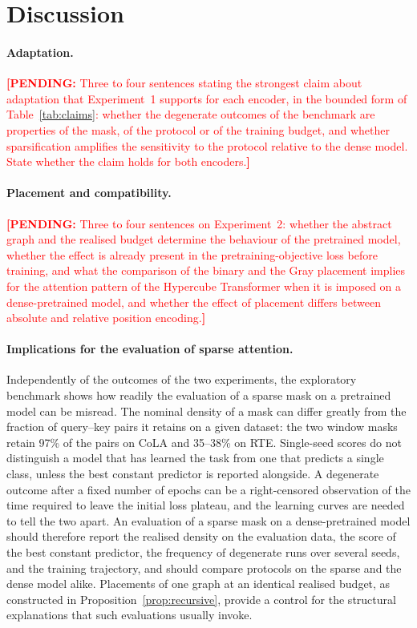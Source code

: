 \documentclass[10pt]{article}
\newcommand{\pending}[1]{\textcolor{red}{\textbf{[PENDING:} #1\textbf{]}}}
\begin{document}
\section{Discussion}
\label{sec:discussion}

\paragraph{Adaptation.} \pending{Three to four sentences stating the strongest claim about adaptation that Experiment~1 supports for each encoder, in the bounded form of Table~\ref{tab:claims}: whether the degenerate outcomes of the benchmark are properties of the mask, of the protocol or of the training budget, and whether sparsification amplifies the sensitivity to the protocol relative to the dense model. State whether the claim holds for both encoders.}

\paragraph{Placement and compatibility.} \pending{Three to four sentences on Experiment~2: whether the abstract graph and the realised budget determine the behaviour of the pretrained model, whether the effect is already present in the pretraining-objective loss before training, and what the comparison of the binary and the Gray placement implies for the attention pattern of the Hypercube Transformer when it is imposed on a dense-pretrained model, and whether the effect of placement differs between absolute and relative position encoding.}

\paragraph{Implications for the evaluation of sparse attention.} Independently of the outcomes of the two experiments, the exploratory benchmark shows how readily the evaluation of a sparse mask on a pretrained model can be misread. The nominal density of a mask can differ greatly from the fraction of query--key pairs it retains on a given dataset: the two window masks retain 97\% of the pairs on CoLA and 35--38\% on RTE. Single-seed scores do not distinguish a model that has learned the task from one that predicts a single class, unless the best constant predictor is reported alongside. A degenerate outcome after a fixed number of epochs can be a right-censored observation of the time required to leave the initial loss plateau, and the learning curves are needed to tell the two apart. An evaluation of a sparse mask on a dense-pretrained model should therefore report the realised density on the evaluation data, the score of the best constant predictor, the frequency of degenerate runs over several seeds, and the training trajectory, and should compare protocols on the sparse and the dense model alike. Placements of one graph at an identical realised budget, as constructed in Proposition~\ref{prop:recursive}, provide a control for the structural explanations that such evaluations usually invoke.
\end{document}
